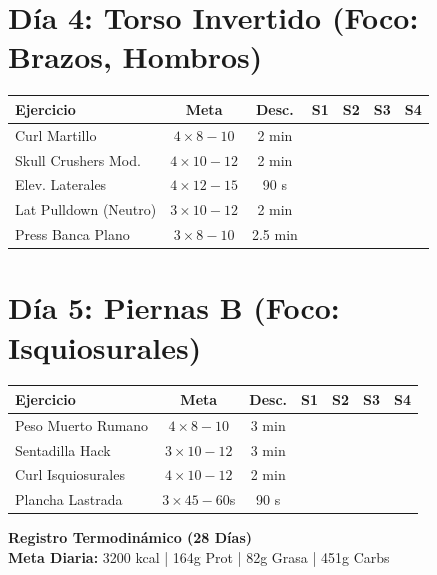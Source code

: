 \documentclass[10pt, a4paper]{article}
\begin{document}
\vspace{0.3cm}

\section*{Día 4: Torso Invertido (Foco: Brazos, Hombros)}
\begin{tabularx}{\textwidth}{|l|c|c|X|X|X|X|}
\hline
\rowcolor{gray!20}
\textbf{Ejercicio} & \textbf{Meta} & \textbf{Desc.} & \textbf{S1} & \textbf{S2} & \textbf{S3} & \textbf{S4} \\ \hline
Curl Martillo & $4 \times 8-10$ & 2 min & & & & \\ \hline
Skull Crushers Mod. & $4 \times 10-12$ & 2 min & & & & \\ \hline
Elev. Laterales & $4 \times 12-15$ & 90 s & & & & \\ \hline
Lat Pulldown (Neutro) & $3 \times 10-12$ & 2 min & & & & \\ \hline
Press Banca Plano & $3 \times 8-10$ & 2.5 min& & & & \\ \hline
\end{tabularx}

\vspace{0.3cm}

\section*{Día 5: Piernas B (Foco: Isquiosurales)}
\begin{tabularx}{\textwidth}{|l|c|c|X|X|X|X|}
\hline
\rowcolor{gray!20}
\textbf{Ejercicio} & \textbf{Meta} & \textbf{Desc.} & \textbf{S1} & \textbf{S2} & \textbf{S3} & \textbf{S4} \\ \hline
Peso Muerto Rumano & $4 \times 8-10$ & 3 min & & & & \\ \hline
Sentadilla Hack & $3 \times 10-12$ & 3 min & & & & \\ \hline
Curl Isquiosurales & $4 \times 10-12$ & 2 min & & & & \\ \hline
Plancha Lastrada & $3 \times 45-60$s& 90 s & & & & \\ \hline
\end{tabularx}

\newpage

\begin{center}
    {\Huge \textbf{Registro Termodinámico (28 Días)}} \\
    \vspace{0.2cm}
    {\large \textbf{Meta Diaria:} 3200 kcal | 164g Prot | 82g Grasa | 451g Carbs}
\end{center}
\end{document}
